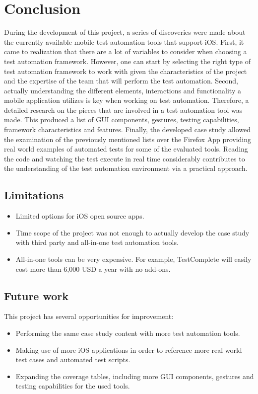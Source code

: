 \chapter{Conclusion}
\label{chapter5}

During the development of this project, a series of discoveries were made about the currently available mobile test automation tools that support iOS. First, it came to realization that there are a lot of variables to consider when choosing a test automation framework. However, one can start by selecting the right type of test automation framework to work with given the characteristics of the project and the expertise of the team that will perform the test automation. Second, actually understanding the different elements, interactions and functionality a mobile application utilizes is key when working on test automation. Therefore, a detailed research on the pieces that are involved in a test automation tool was made. This produced a list of GUI components, gestures, testing capabilities, framework characteristics and features. Finally, the developed case study allowed the examination of the previously mentioned lists over the Firefox App providing real world examples of automated tests for some of the evaluated tools. Reading the code and watching the test execute in real time considerably contributes to the understanding of the test automation environment via a practical approach.

\section{Limitations}
	\begin{itemize}
		\item Limited options for iOS open source apps.
		\item Time scope of the project was not enough to actually develop the case study with third party and all-in-one test automation tools.
		\item All-in-one tools can be very expensive. For example, TestComplete will easily cost more than 6,000 USD a year with no add-ons.
	\end{itemize}


\section{Future work}

This project has several opportunities for improvement:

	\begin{itemize}
		\item Performing the same case study content with more test automation tools. 
		\item Making use of more iOS applications in order to reference more real world test cases and automated test scripts.
		\item Expanding the coverage tables, including more GUI components, gestures and testing capabilities for the used tools.
	\end{itemize}

